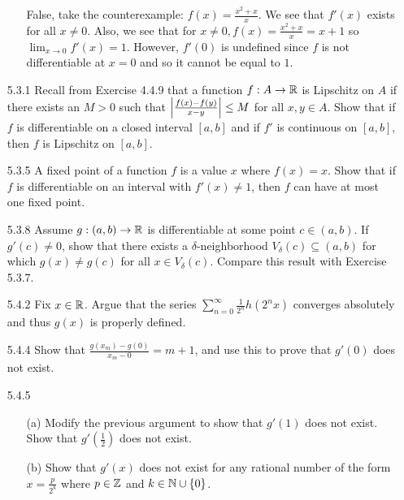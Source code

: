 \documentclass[12pt,letterpaper]{article}
\begin{document}
\begin{itemize}[leftmargin=!,labelindent=5pt]
\begin{itemize}
                        False, take the counterexample: $f(x) = \frac{x^2 + x}{x}$.
                        We see that $f'(x)$ exists for all $x \neq 0$.
                        Also, we see that for $x \neq 0, f(x) = \frac{x^2 + x}{x} = x+1$ so $\lim_{x \to 0} f'(x) = 1$.
                        However, $f'(0)$ is undefined since $f$ is not differentiable at $x=0$ and so it cannot be equal to $1$.
            \end{itemize}
        \item [5.3.1] Recall from Exercise 4.4.9 that a function $f : A \to \mathbb{R}$ is Lipschitz on $A$ if there exists an $M > 0$ such that $\abs{\frac{f(x) - f(y)}{x-y}} \leq M$ for all $x,y \in A$. Show that if $f$ is differentiable on a closed interval $[a, b]$ and if $f'$ is continuous on $[a,b]$, then $f$ is Lipschitz on $[a,b]$.
        \item [5.3.5] A fixed point of a function $f$ is a value $x$ where $f(x) = x$. Show that if $f$ is differentiable on an interval with $f'(x) \neq 1$, then $f$ can have at most one fixed point.
        \item [5.3.8] Assume $g:(a,b) \to \mathbb{R}$ is differentiable at some point $c \in (a,b)$. If $g'(c) \neq 0$, show that there exists a $\delta$-neighborhood $V_\delta(c) \subseteq (a,b)$ for which $g(x) \neq g(c)$ for all $x \in V_\delta(c)$. Compare this result with Exercise 5.3.7.
        \item [5.4.2] Fix $x \in \mathbb{R}$. Argue that the series $\sum_{n=0}^{\infty} \frac{1}{2^n}h(2^n x)$ converges absolutely and thus $g(x)$ is properly defined.
        \item [5.4.4] Show that $\frac{g(x_m) - g(0)}{x_m - 0} = m+1$, and use this to prove that $g'(0)$ does not exist.
        \item [5.4.5] 
            \begin{itemize}
                \item [(a)] Modify the previous argument to show that $g'(1)$ does not exist. Show that $g'(\frac{1}{2})$ does not exist.
                \item [(b)] Show that $g'(x)$ does not exist for any rational number of the form $x = \frac{p}{2^k}$ where $p \in \mathbb{Z}$ and $k \in \mathbb{N} \cup \{0\}$.
            \end{itemize}
    \end{itemize}
\end{document}
